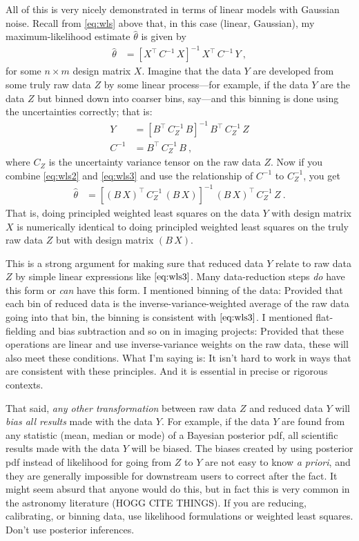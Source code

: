 \documentclass{article}
\newcommand{\foreign}[1]{\textsl{#1}}
\begin{document}
All of this is very nicely demonstrated in terms of linear models with Gaussian noise.
Recall from \eqref{eq:wls} above that, in this case (linear, Gaussian), my maximum-likelihood estimate $\hat\theta$ is given by
\begin{align}
    \hat\theta &= [X^\top\,C^{-1}\,X]^{-1}\,X^\top\,C^{-1}\,Y ~,\label{eq:wls2}
\end{align}
for some $n\times m$ design matrix $X$.
Imagine that the data $Y$ are developed from some truly raw data $Z$ by some linear process---for example, if the data $Y$ are the data $Z$ but binned down into coarser bins, say---and this binning is done using the uncertainties correctly; that is:
\begin{align}
    Y &= [B^\top\,C_Z^{-1}\,B]^{-1}\,B^\top\,C_Z^{-1}\,Z \label{eq:wls3} \\
    C^{-1} &= B^\top\,C_Z^{-1}\,B ~,
\end{align}
where $C_Z$ is the uncertainty variance tensor on the raw data $Z$.
Now if you combine \eqref{eq:wls2} and \eqref{eq:wls3} and use the relationship of $C^{-1}$ to $C_Z^{-1}$, you get
\begin{align}
    \hat\theta &= [(B\,X)^\top\,C_Z^{-1}\,(B\,X)]^{-1}\,(B\,X)^\top\,C_Z^{-1}\,Z ~.\label{eq:wls4}
\end{align}
That is, doing principled weighted least squares on the data $Y$ with design matrix $X$ is numerically identical to doing principled weighted least squares on the truly raw data $Z$ but with design matrix $(B\,X)$.

This is a strong argument for making sure that reduced data $Y$ relate to raw data $Z$ by simple linear expressions like $\eqref{eq:wls3}$.
Many data-reduction steps \emph{do} have this form or \emph{can} have this form.
I mentioned binning of the data: Provided that each bin of reduced data is the inverse-variance-weighted average of the raw data going into that bin, the binning is consistent with $\eqref{eq:wls3}$.
I mentioned flat-fielding and bias subtraction and so on in imaging projects:
Provided that these operations are linear and use inverse-variance weights on the raw data, these will also meet these conditions.
What I'm saying is: It isn't hard to work in ways that are consistent with these principles.
And it is essential in precise or rigorous contexts.

That said, \emph{any other transformation} between raw data $Z$ and reduced data $Y$ will \emph{bias all results} made with the data $Y$.
For example, if the data $Y$ are found from any statistic (mean, median or mode) of a Bayesian posterior pdf, all scientific results made with the data $Y$ will be biased.
The biases created by using posterior pdf instead of likelihood for going from $Z$ to $Y$ are not easy to know \foreign{a priori}, and they are generally impossible for downstream users to correct after the fact.
It might seem absurd that anyone would do this, but in fact this is very common in the astronomy literature (HOGG CITE THINGS).
If you are reducing, calibrating, or binning data, use likelihood formulations or weighted least squares.
Don't use posterior inferences.
\end{document}
